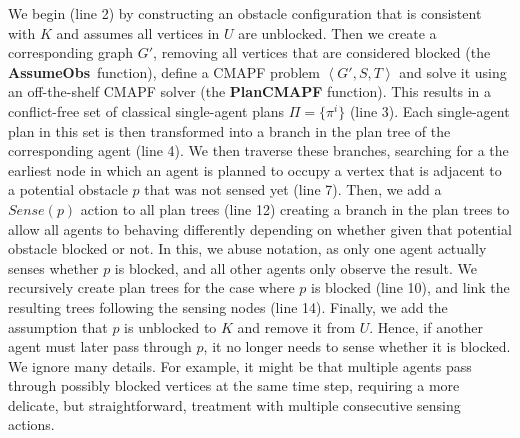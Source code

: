 \documentclass[letterpaper]{article} %
\newcommand{\assumeObs}{\textbf{AssumeObs}}
\newcommand{\tuple}[1]{\ensuremath{\left \langle #1 \right \rangle }}
\begin{document}
We begin (line 2) by constructing an obstacle configuration that is consistent with $K$ and assumes all vertices in $U$ are unblocked. 
Then we create a corresponding graph $G'$, removing all vertices that are considered blocked (the \assumeObs\ function), define a CMAPF problem $\tuple{G',S,T}$ and solve it using an off-the-shelf CMAPF solver  (the \textbf{PlanCMAPF} function). 
This results in a conflict-free set of classical single-agent plans $\Pi=\{\pi^i\}$  (line 3). Each single-agent plan in this set is then transformed into a branch in the plan tree of the corresponding agent (line 4).
We then traverse these branches, searching for a the earliest node in which an agent is planned to occupy a vertex that is adjacent to a potential obstacle $p$ that was not sensed yet (line 7). 
Then, we add a $Sense(p)$ action to all plan trees (line 12)  creating a branch in the plan trees to allow all agents to behaving differently depending on whether given that potential obstacle blocked or not. 
In this, we abuse notation, as only one agent actually senses whether $p$ is blocked, and all other agents only observe the result. 
We recursively create plan trees for the case where $p$ is blocked (line 10), and link the resulting trees following the sensing nodes (line 14).
Finally, we add the assumption that $p$ is unblocked to $K$ and remove it from $U$. Hence, if another agent must later pass through $p$, it no longer needs to sense whether it is blocked. 
We ignore many details. For example, it might be that multiple agents pass through possibly blocked vertices at the same time step, requiring a more delicate, but straightforward, treatment with multiple consecutive sensing actions.
\end{document}
